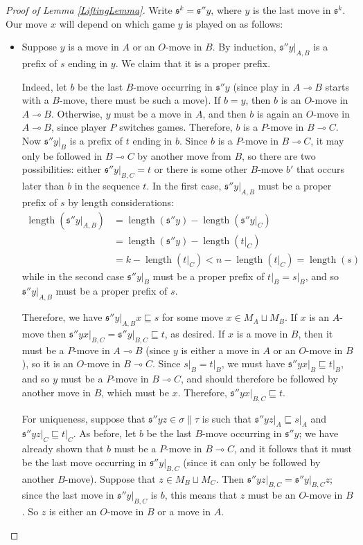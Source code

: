 \documentclass[11pt]{article} %
\theoremstyle{plain} %
\theoremstyle{definition} %
\theoremstyle{exercisestyle}
\renewcommand{\implies}{\multimap}
\newcommand{\cprd}{\sqcup}
\newcommand{\s}{\mathfrak s}
\newcommand{\prefix}{\sqsubseteq}
\DeclareMathOperator{\length}{length}
\begin{document}
\begin{proof}[Proof of Lemma \ref{LiftingLemma}]
  Write $\s^k=\s''y$, where $y$ is the last move in $\s^k$.  Our move $x$ will depend on which game $y$ is played on as follows:
  
  \begin{itemize}
    \item Suppose $y$ is a move in $A$ or an $O$-move in $B$.  By induction, $\s''y\vert_{A,B}$ is a prefix of $s$ ending in $y$.  We claim that it is a proper prefix.  

      Indeed, let $b$ be the last $B$-move occurring in $\s''y$ (since play in $A\implies B$ starts with a $B$-move, there must be such a move).  If $b=y$, then $b$ is an $O$-move in $A\implies B$.  Otherwise, $y$ must be a move in $A$, and then $b$ is again an $O$-move in $A\implies B$, since player $P$ switches games.  Therefore, $b$ is a $P$-move in $B\implies C$.  Now $\s''y\vert_B$ is a prefix of $t$ ending in $b$.  Since $b$ is a $P$-move in $B\implies C$, it may only be followed in $B\implies C$ by another move from $B$, so there are two possibilities: either $\s''y\vert_{B,C}=t$ or there is some other $B$-move $b'$ that occurs later than $b$ in the sequence $t$.  In the first case, $\s''y\vert_{A,B}$ must be a proper prefix of $s$ by length considerations:
      \begin{align*}
        \length(\s''y\vert_{A,B}) & = \length(\s''y) - \length(\s''y\vert_C) \\
          & = \length(\s''y) - \length(t\vert_C) \\
          & = k - \length(t\vert_C) < n - \length(t\vert_C) = \length(s)
      \end{align*}
      while in the second case $\s''y\vert_B$ must be a proper prefix of $t\vert_B=s\vert_B$, and so $\s''y\vert_{A,B}$ must be a proper prefix of $s$.

      Therefore, we have $\s''y\vert_{A,B}x\prefix s$ for some move $x\in M_A\cprd M_B$.  If $x$ is an $A$-move then $\s''yx\vert_{B,C}=\s''y\vert_{B,C}\prefix t$, as desired.  If $x$ is a move in $B$, then it must be a $P$-move in $A\implies B$ (since $y$ is either a move in $A$ or an $O$-move in $B$), so it is an $O$-move in $B\implies C$.  Since $s\vert_B=t\vert_B$, we must have $\s''yx\vert_B\prefix t\vert_B$, and so $y$ must be a $P$-move in $B\implies C$, and should therefore be followed by another move in $B$, which must be $x$.  Therefore, $\s''yx\vert_{B,C}\prefix t$.

      For uniqueness, suppose that $\s''yz\in\sigma\|\tau$ is such that $\s''yz\vert_A\prefix s\vert_A$ and $\s''yz\vert_C\prefix t\vert_C$.  As before, let $b$ be the last $B$-move occurring in $\s''y$; we have already shown that $b$ must be a $P$-move in $B\implies C$, and it follows that it must be the last move occurring in $\s''y\vert_{B,C}$ (since it can only be followed by another $B$-move).  Suppose that $z\in M_B\cprd M_C$.  Then $\s''yz\vert_{B,C}=\s''y\vert_{B,C}z$; since the last move in $\s''y\vert_{B,C}$ is $b$, this means that $z$ must be an $O$-move in $B$.  So $z$ is either an $O$-move in $B$ or a move in $A$.


\end{itemize}
\end{proof}
\end{document}
